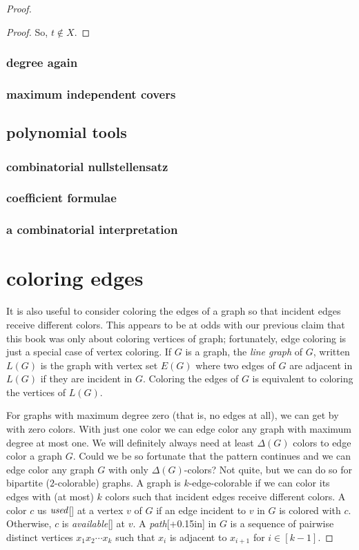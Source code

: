 \documentclass{amsbook}
\newcommand{\aaside}[2]{\marginnote{\scriptsize{#1}}[#2]}
\theoremstyle{plain}
\numberwithin{equation}{chapter}
\newcommand{\irange}[1]{\left[#1\right]}
\begin{document}
\begin{proof}
\begin{proof}
So, $t \not \in X$.
\end{proof}

\subsection*{degree again}
\subsection*{maximum independent covers}
\section*{polynomial tools}
\subsection*{combinatorial nullstellensatz}
\subsection*{coefficient formulae}
\subsection*{a combinatorial interpretation}

\chapter*{coloring edges}
It is also useful to consider coloring the edges of a graph so that incident edges receive different colors.  This
appears to be at odds with our previous claim that this book was only about coloring vertices of graph; fortunately, edge coloring
is just a special case of vertex coloring.  If $G$ is a graph, the \emph{line graph} of $G$, written
$L(G)$ is the graph with vertex set $E(G)$ where two edges of $G$ are adjacent in $L(G)$ if they are incident in $G$.  Coloring
the edges of $G$ is equivalent to coloring the vertices of $L(G)$.

For graphs with maximum degree zero (that is, no edges at all), we can get by with zero colors.  
With just one color we can edge color any graph with maximum degree at most one.  We will definitely always need at least $\Delta(G)$ colors
to edge color a graph $G$.  Could we be so fortunate that the pattern continues
and we can edge color any graph $G$ with only $\Delta(G)$-colors? Not quite, but we can do so for bipartite ($2$-colorable) graphs.
A graph is $k$-edge-colorable if we can color its edges with (at most) $k$ colors such that incident edges receive different colors.
A color $c$ us $\emph{used}$\aaside{used}{} at a vertex $v$ of $G$ if an edge incident to $v$ in $G$ is colored with $c$. Otherwise, $c$ is \emph{available}\aaside{available}{} at $v$.
A \emph{path}\aaside{path}{+0.15in} in $G$ is a sequence of pairwise distinct vertices $x_1x_2\cdots x_k$ such that $x_i$ is adjacent to $x_{i+1}$ for $i \in \irange{k-1}$.


\end{proof}
\end{document}
